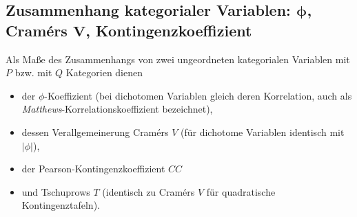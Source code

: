 \subsection[Zusammenhang kategorialer Variablen]{Zusammenhang kategorialer Variablen: $\bm{\phi}$, Cramérs $\bm{V}$, Kontingenzkoeffizient}
\label{sec:assocMisc}

Als Maße des Zusammenhangs von zwei ungeordneten kategorialen Variablen mit $P$ bzw. mit $Q$ Kategorien dienen
\begin{itemize}
\item der $\phi$-Koeffizient (bei dichotomen Variablen gleich deren Korrelation, auch als \emph{Matthews}-Korrelationskoeffizient bezeichnet),
\item dessen Verallgemeinerung Cramérs $V$ (für dichotome Variablen identisch mit $|\phi|$),
\item der Pearson-Kontingenzkoeffizient $CC$
\item und Tschuprows $T$ (identisch zu Cramérs $V$ für quadratische Kontingenztafeln).
\end{itemize}

